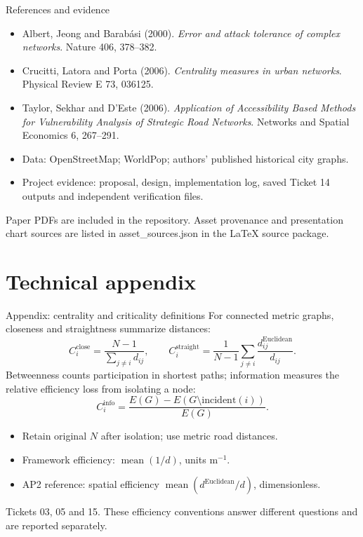 \documentclass[11pt,aspectratio=169]{beamer}
\newcommand{\src}[1]{\vfill{\fontsize{7.5}{9}\selectfont\color{Muted}#1\par}}
\begin{document}
\begin{frame}{References and evidence}
\small
\begin{itemize}\setlength{\itemsep}{3mm}
\item Albert, Jeong and Barab\'asi (2000). \emph{Error and attack tolerance of complex networks}. Nature 406, 378--382.
\item Crucitti, Latora and Porta (2006). \emph{Centrality measures in urban networks}. Physical Review E 73, 036125.
\item Taylor, Sekhar and D'Este (2006). \emph{Application of Accessibility Based Methods for Vulnerability Analysis of Strategic Road Networks}. Networks and Spatial Economics 6, 267--291.
\item Data: OpenStreetMap; WorldPop; authors' published historical city graphs.
\item Project evidence: proposal, design, implementation log, saved Ticket 14 outputs and independent verification files.
\end{itemize}
\src{Paper PDFs are included in the repository. Asset provenance and presentation chart sources are listed in asset\_sources.json in the LaTeX source package.}
\end{frame}

\appendix
\section{Technical appendix}
\begin{frame}{Appendix: centrality and criticality definitions}
\small
For connected metric graphs, closeness and straightness summarize distances:
\[
C_i^{\mathrm{close}}=\frac{N-1}{\sum_{j\ne i}d_{ij}},\qquad
C_i^{\mathrm{straight}}=\frac{1}{N-1}\sum_{j\ne i}\frac{d^{\mathrm{Euclidean}}_{ij}}{d_{ij}}.
\]
Betweenness counts participation in shortest paths; information measures the relative efficiency loss from isolating a node:
\[
C_i^{\mathrm{info}}=\frac{E(G)-E(G\setminus\mathrm{incident}(i))}{E(G)}.
\]
\begin{itemize}\setlength{\itemsep}{2mm}
\item Retain original $N$ after isolation; use metric road distances.
\item Framework efficiency: $\operatorname{mean}(1/d)$, units $\mathrm{m}^{-1}$.
\item AP2 reference: spatial efficiency $\operatorname{mean}(d^{\mathrm{Euclidean}}/d)$, dimensionless.
\end{itemize}
\src{Tickets 03, 05 and 15. These efficiency conventions answer different questions and are reported separately.}
\end{frame}
\end{document}
